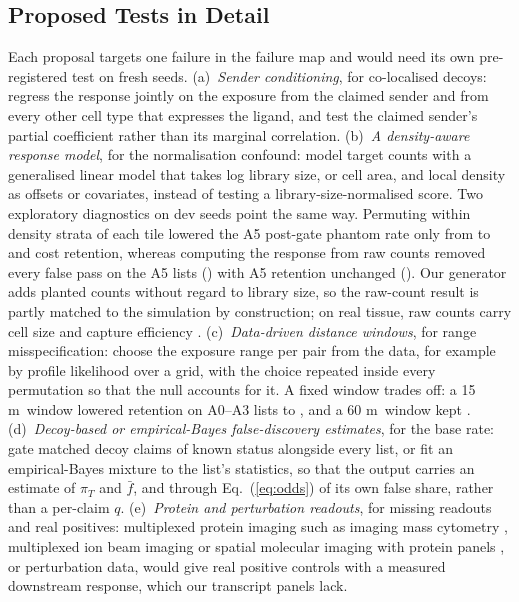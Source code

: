 \documentclass[letterpaper]{article} %
\newcommand{\um}{\ifmmode\,\text{\textmu m}\else\,\textmu m\fi}
\begin{document}
\subsection{Proposed Tests in Detail}
Each proposal targets one failure in the failure map and would need its own pre-registered test on fresh seeds.
(a)~\emph{Sender conditioning}, for co-localised decoys: regress the response jointly on the exposure from the claimed
sender and from every other cell type that expresses the ligand, and test the claimed sender's partial coefficient
rather than its marginal correlation.
(b)~\emph{A density-aware response model}, for the normalisation confound: model target counts with a generalised linear
model that takes log library size, or cell area, and local density as offsets or covariates, instead of testing a
library-size-normalised score. Two exploratory diagnostics on dev seeds point the same way. Permuting within density
strata of each tile lowered the A5 post-gate phantom rate only from \senFrozenAfivePRafter{} to
\senNullDensityAfivePRafter{} and cost retention, whereas computing the response from raw counts removed every false
pass on the A5 lists (\senRespRawAfivePRafter{}) with A5 retention unchanged (\senRespRawAfiveRet{}). Our generator
adds planted counts without regard to library size, so the raw-count result is partly matched to the simulation by
construction; on real tissue, raw counts carry cell size and capture efficiency \cite{bhuva2024,atta2024}.
(c)~\emph{Data-driven distance windows}, for range misspecification: choose the exposure range per pair from the data,
for example by profile likelihood over a grid, with the choice repeated inside every permutation so that the null
accounts for it. A fixed window trades off: a 15\um\ window lowered retention on A0--A3 lists to
\senRonefiveAzeroAthreeRet{}, and a 60\um\ window kept \senRsixzeroAzeroAthreeRet{}.
(d)~\emph{Decoy-based or empirical-Bayes false-discovery estimates}, for the base rate: gate matched decoy claims of
known status alongside every list, or fit an empirical-Bayes mixture to the list's statistics, so that the output
carries an estimate of $\pi_T$ and $\bar f$, and through Eq.~(\ref{eq:odds}) of its own false share, rather than a
per-claim $q$.
(e)~\emph{Protein and perturbation readouts}, for missing readouts and real positives: multiplexed protein imaging such
as imaging mass cytometry \cite{giesen2014imc}, multiplexed ion beam imaging \cite{angelo2014mibi} or spatial molecular
imaging with protein panels \cite{he2022cosmx}, or perturbation data, would give real positive controls with a
measured downstream response, which our transcript panels lack.
\end{document}
